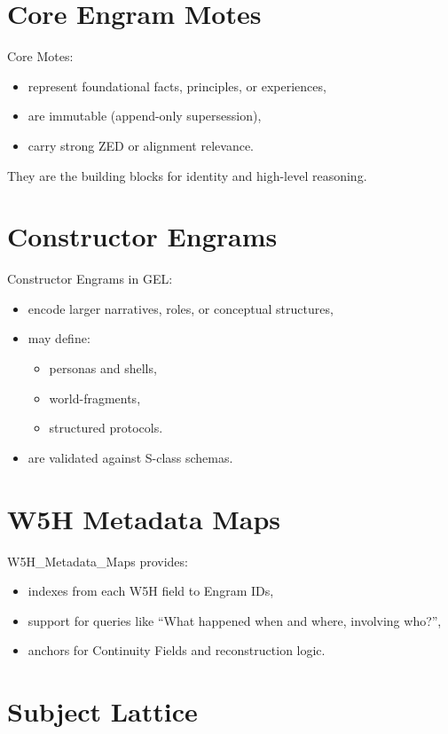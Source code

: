 \section{Core Engram Motes}

Core Motes:
\begin{itemize}
    \item represent foundational facts, principles, or experiences,
    \item are immutable (append-only supersession),
    \item carry strong ZED or alignment relevance.
\end{itemize}

They are the building blocks for identity and high-level reasoning.

\section{Constructor Engrams}

Constructor Engrams in GEL:
\begin{itemize}
    \item encode larger narratives, roles, or conceptual structures,
    \item may define:
          \begin{itemize}
              \item personas and shells,
              \item world-fragments,
              \item structured protocols.
          \end{itemize}
    \item are validated against S-class schemas.
\end{itemize}

\section{W5H Metadata Maps}

W5H\_Metadata\_Maps provides:
\begin{itemize}
    \item indexes from each W5H field to Engram IDs,
    \item support for queries like ``What happened when and where, involving who?'',
    \item anchors for Continuity Fields and reconstruction logic.
\end{itemize}

\section{Subject Lattice}

